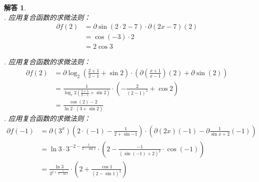 \documentclass[12pt,UTF8]{ctexbook}
\newtheorem*{so}{解答}
\begin{document}
\begin{so}
    \mbox{} \\
    . 应用复合函数的求微法则：
    \begin{align*}
        \partial f(2) &= \partial \sin (2 \cdot 2 - 7) \cdot \partial (2x - 7) (2)  \\
        &= \cos{(-3)} \cdot 2  \\
        &= 2 \cos{3}   
    \end{align*}
    
    . 应用复合函数的求微法则：
    \begin{align*}
        \partial f(2) &= \partial \log_2 \left(\frac{2+1}{2-1} + \sin{2}\right) \cdot \left(\partial \left(\frac{x+1}{x-1}\right) (2) + \partial \sin (2) \right) \\
        &= \frac{1}{\log_e{2} \left(\frac{2+1}{2-1} + \sin{2}\right)} \cdot \left( -\frac{2}{(2 - 1)^2} + \cos{2} \right)  \\
        &= \frac{\cos{(2)} - 2}{\ln{2} \cdot (3 + \sin{2})}   
    \end{align*}
    . 应用复合函数的求微法则：
    \begin{align*}
        \partial f(-1) &= \partial (3^x) (2\cdot (-1) - \frac{1}{2 + \sin{-1}}) \cdot \left(\partial (2x) (-1) - \partial \frac{1}{\sin{x} + 2} (-1) \right)  \\
        &= \ln{3} \cdot 3^{-2 - \frac{1}{2 - \sin{1}}} \cdot \left(2 - \frac{-1}{(\sin{(-1)} + 2)^2} \cdot \cos{(-1)} \right)  \\
        &= \frac{\ln{3}}{3^{2 + \frac{1}{2 - \sin{1}}}} \cdot \left(2 + \frac{\cos{1}}{(2 - \sin{1})^2}\right)  
    \end{align*}

\end{so}
\end{document}
